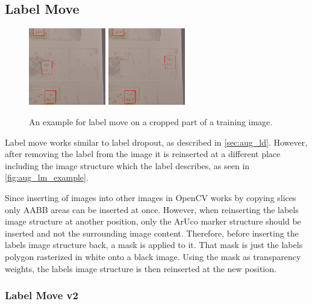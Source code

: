 \documentclass[10pt]{book}
\newcommand{\figureref}[1]{\autoref{#1}}
\begin{document}
\subsection{Label Move}

\begin{figure}
  \centering
     {\includegraphics[width=0.3\textwidth]{image/aug_lm_before}}
     {\includegraphics[width=0.3\textwidth]{image/aug_lm_after}}
  \caption{An example for label move on a cropped part of a training image.}
  \label{fig:aug_lm_example}
\end{figure}

Label move works similar to label dropout, as described in \autoref{sec:aug_ld}. However, after removing the label from the image it is reinserted at a different place including the image structure which the label describes, as seen in \figureref{fig:aug_lm_example}. 

Since inserting of images into other images in OpenCV works by copying slices only \ac{AABB} areas can be inserted at once. However, when reinserting the labels image structure at another position, only the \ac{ArUco} marker structure should be inserted and not the surrounding image content. Therefore, before inserting the labels image structure back, a mask is applied to it. That mask is just the labels polygon rasterized in white onto a black image. Using the mask as transparency weights, the labels image structure is then reinserted at the new position.

\subsubsection{Label Move v2}
\end{document}
